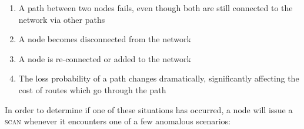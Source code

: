 \documentclass[letterpaper]{article}
\begin{document}
\begin{enumerate}
  \item A path between two nodes fails, even though both are still connected to the network via other
  paths
  \item A node becomes disconnected from the network
  \item A node is re-connected or added to the network
  \item The loss probability of a path changes dramatically, significantly affecting the cost of
  routes which go through the path
\end{enumerate}

\noindent In order to determine if one of these situations has occurred, a node will issue a 
\textsc{scan} whenever it encounters one of a few anomalous scenarios:
\end{document}
